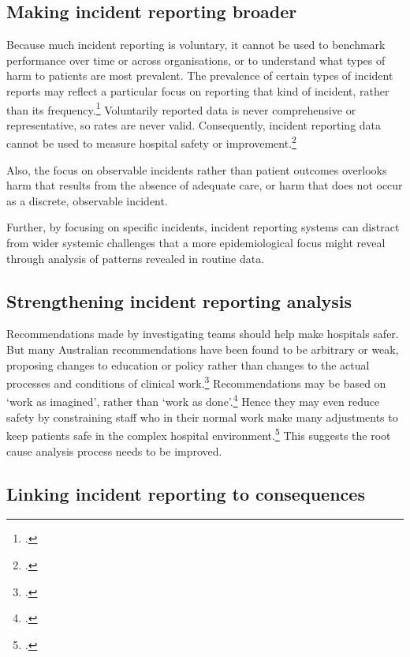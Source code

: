 \documentclass[FrontPage]{grattan}
\begin{document}
\subsection{Making incident reporting broader}\label{sec:Incident-reporting-not-broad-enough}

Because much incident reporting is voluntary, it cannot be used to benchmark performance over time or across organisations, or to understand what types of harm to patients are most prevalent. The prevalence of certain types of incident reports may reflect a particular focus on reporting that kind of incident, rather than its frequency.\footnote{\textcite{abujudeh2014outpatient}.}
Voluntarily reported data is never comprehensive or representative, so rates are never valid. Consequently, incident reporting data cannot be used to measure hospital safety or improvement.\footcites{RN55}{RN56}  

Also, the focus on observable incidents rather than patient outcomes overlooks harm that results from the absence of adequate care, or harm that does not occur as a discrete, observable incident. 

Further, by focusing on specific incidents, incident reporting systems can distract from wider systemic challenges that a more epidemiological focus might reveal through analysis of patterns revealed in routine data.

\subsection{Strengthening incident reporting analysis}\label{sec:Incident-analysis-weak}

Recommendations made by investigating teams should help make hospitals safer. But many Australian recommendations have been found to be arbitrary or weak,  proposing changes to education or policy rather than changes to the actual processes and conditions of clinical work.\footcites{RN58}{RN57}
Recommendations may be based on ‘work as imagined’, rather than ‘work as done’.\footcite{daly2017}
Hence they may even reduce safety by constraining staff who in their normal work make many adjustments to keep patients safe in the complex hospital environment.\footcites{RN62}{trbovich2017root}{RN63}{RN60}
This suggests the root cause analysis process needs to be improved.

\subsection{Linking incident reporting to consequences}\label{sec:Incident-reporting-not-linked-to-consequences}
\end{document}
